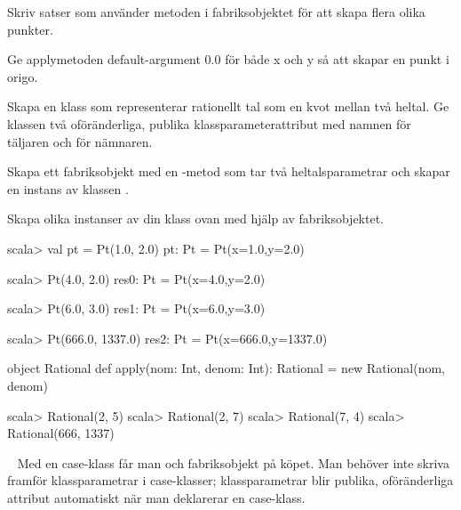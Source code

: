 \Subtask Skriv satser som använder metoden  i fabriksobjektet  för att skapa flera olika punkter.

\Subtask Ge applymetoden default-argument 0.0 för både x och y så att  skapar en punkt i origo.

\Subtask Skapa en klass  som representerar rationellt tal som en kvot mellan två heltal. Ge klassen två oföränderliga, publika klassparameterattribut med namnen  för täljaren och  för nämnaren.

\Subtask Skapa ett fabriksobjekt med en -metod som tar två heltalsparametrar och skapar en instans av klassen .

\Subtask Skapa olika instanser av din klass  ovan med hjälp av fabriksobjektet.


\SOLUTION


\TaskSolved \what
 

\SubtaskSolved 
\begin{REPL}
scala> val pt = Pt(1.0, 2.0)
pt: Pt = Pt(x=1.0,y=2.0)

scala> Pt(4.0, 2.0)
res0: Pt = Pt(x=4.0,y=2.0)

scala> Pt(6.0, 3.0)
res1: Pt = Pt(x=6.0,y=3.0)

scala> Pt(666.0, 1337.0)
res2: Pt = Pt(x=666.0,y=1337.0)
\end{REPL}

\SubtaskSolved  {}

\SubtaskSolved  {}

\SubtaskSolved 
\begin{REPLnonum}
object Rational {
def apply(nom: Int, denom: Int): Rational = new Rational(nom, denom)
}
\end{REPLnonum}

\SubtaskSolved 
\begin{REPL}
scala> Rational(2, 5)
scala> Rational(2, 7)
scala> Rational(7, 4)
scala> Rational(666, 1337)
\end{REPL}


\QUESTEND









\QUESTBEGIN

\Task  \what~  Med en case-klass får man  och fabriksobjekt på köpet. Man behöver inte skriva  framför klassparametrar i case-klasser; klassparametrar blir publika, oföränderliga attribut automatiskt när man deklarerar en case-klass.

